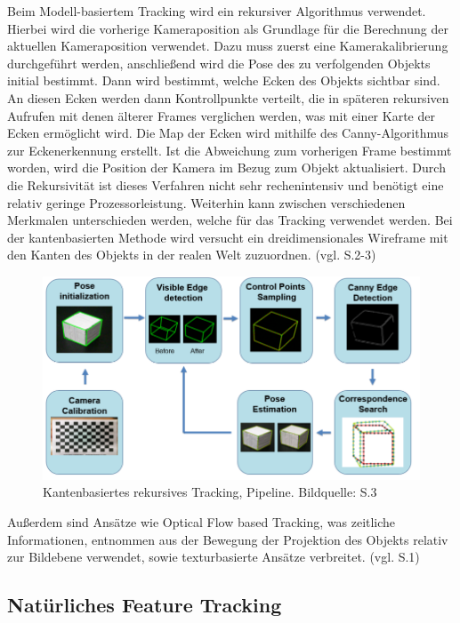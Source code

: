 Beim Modell-basiertem Tracking wird ein rekursiver Algorithmus verwendet. Hierbei wird die vorherige Kameraposition als Grundlage für die Berechnung der aktuellen Kameraposition verwendet. Dazu muss zuerst eine Kamerakalibrierung durchgeführt werden, anschließend wird die Pose des zu verfolgenden Objekts initial bestimmt. Dann wird bestimmt, welche Ecken des Objekts sichtbar sind. An diesen Ecken werden dann Kontrollpunkte verteilt, die in späteren rekursiven Aufrufen mit denen älterer Frames verglichen werden, was mit einer Karte der Ecken ermöglicht wird. Die Map der Ecken wird mithilfe des Canny-Algorithmus zur Eckenerkennung erstellt. Ist die Abweichung zum vorherigen Frame bestimmt worden, wird die Position der Kamera im Bezug zum Objekt aktualisiert. Durch die Rekursivität ist dieses Verfahren nicht sehr rechenintensiv und benötigt eine relativ geringe Prozessorleistung. Weiterhin kann zwischen verschiedenen Merkmalen unterschieden werden, welche für das Tracking verwendet werden. Bei der kantenbasierten Methode wird versucht ein dreidimensionales Wireframe mit den Kanten des Objekts in der realen Welt zuzuordnen. (vgl. \cite{model_based} S.2-3)

\begin{figure}[H]
	\centering
	\includegraphics[scale=0.75]{wire.png}
	\caption{Kantenbasiertes rekursives Tracking, Pipeline. Bildquelle: \cite{model_based} S.3}
\end{figure} 

Außerdem sind Ansätze wie \glqq Optical Flow based Tracking\grqq{}, was zeitliche Informationen, entnommen aus der Bewegung der Projektion des Objekts relativ zur Bildebene verwendet, sowie texturbasierte Ansätze verbreitet. (vgl. \cite{model_based} S.1)

\subsection{Natürliches Feature Tracking}

